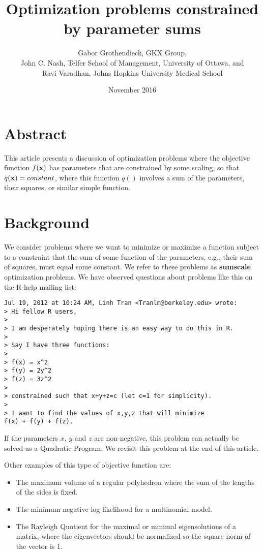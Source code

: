 \documentclass[11pt]{article}\usepackage[]{graphicx}\usepackage[]{color}
\newcommand{\B}[1]{{\bf #1 \rm}}
\begin{document}
\title{Optimization problems constrained by parameter sums}
\author{Gabor Grothendieck, GKX Group,\\
John C. Nash, Telfer School of Management, University of Ottawa, and\\
Ravi Varadhan, Johns Hopkins University Medical School}
\date{November 2016}
\maketitle

\section*{Abstract}

This article presents a discussion of optimization problems where the 
objective function $f(\B{x})$ has parameters that are constrained by some
scaling, so that $q(\B{x}) = constant$, where this function $q()$ involves
a sum of the parameters, their squares, or similar simple function.

\section{Background}

We consider problems where we want to minimize or maximize a function subject to a constraint
that the sum of some function of the parameters, e.g., their sum of squares, must 
equal some constant.
We refer to these problems as \B{sumscale} optimization problems. We have observed questions 
about problems like this on the R-help mailing list: 

\begin{verbatim}
Jul 19, 2012 at 10:24 AM, Linh Tran <Tranlm@berkeley.edu> wrote:
> Hi fellow R users,
>
> I am desperately hoping there is an easy way to do this in R.
>
> Say I have three functions:
>
> f(x) = x^2
> f(y) = 2y^2
> f(z) = 3z^2
>
> constrained such that x+y+z=c (let c=1 for simplicity).
>
> I want to find the values of x,y,z that will minimize 
f(x) + f(y) + f(z).
\end{verbatim}

If the parameters $x$, $y$ and $z$ are non-negative, this problem can actually 
be solved as a Quadratic Program. We revisit this problem at the end of this
article.

Other examples of this type of objective function are:

\begin{itemize}
\item{The maximum volume  of a regular polyhedron where the sum of the lengths
of the sides is fixed.}
\item{The minimum negative log likelihood for a multinomial model.}
\item{The Rayleigh Quotient for the maximal or minimal eigensolutions of a matrix, where
the eigenvectors should be normalized so the square norm of the vector is 1.}
\end{itemize}
\end{document}
